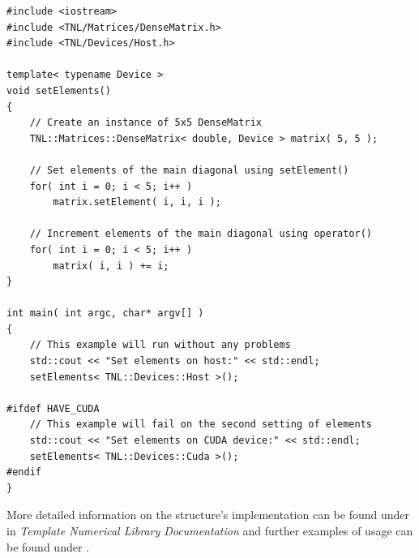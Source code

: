 \begin{lstlisting}[caption={Code example showing the use of \code{setElement()}, and \code{operator()}; \code{getElement()} and getting a matrix element using \code{operator()} would be done similarly. The example requires the TNL library to already be installed. As mentioned in the code, the \code{setElements()} function will run correctly when evoked using the \code{TNL::Devices::Host} template parameter. However, if the \code{DenseMatrix} instance is allocated on the device, then the first setting of elements (using \code{setElement()}) will be slow due to the data transfer between the host and the device - each call will mean a unique data transfer. Furthermore, the second setting of elements (using \code{operator()}) will fail as \code{operator()} will be called from a host function on a \code{DenseMatrix} instance allocated on the device. For the second setter to work, it would need to be called from within a kernel. Taken from section \code{Tutorials/Matrices/DenseMatrices} in the \emph{Template Numerical Library Documentation} \cite{Ednu6dyrkWKz1Bv2}.},label={Listing:implementation-dense-matrix-getters-setters}]
#include <iostream>
#include <TNL/Matrices/DenseMatrix.h>
#include <TNL/Devices/Host.h>

template< typename Device >
void setElements()
{
	// Create an instance of 5x5 DenseMatrix
	TNL::Matrices::DenseMatrix< double, Device > matrix( 5, 5 );
	
	// Set elements of the main diagonal using setElement()
	for( int i = 0; i < 5; i++ )
		matrix.setElement( i, i, i );
	
	// Increment elements of the main diagonal using operator()
	for( int i = 0; i < 5; i++ )
		matrix( i, i ) += i;
}

int main( int argc, char* argv[] )
{
	// This example will run without any problems
	std::cout << "Set elements on host:" << std::endl;
	setElements< TNL::Devices::Host >();
	
#ifdef HAVE_CUDA
	// This example will fail on the second setting of elements
	std::cout << "Set elements on CUDA device:" << std::endl;
	setElements< TNL::Devices::Cuda >();
#endif
}
\end{lstlisting}

More detailed information on the structure's implementation can be found under  in \emph{Template Numerical Library Documentation} \cite{Ednu6dyrkWKz1Bv2} and further examples of usage can be found under .



